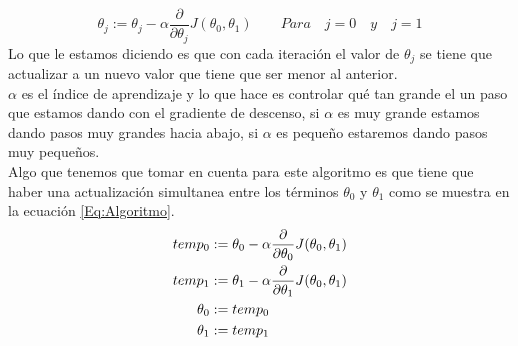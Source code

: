 \documentclass{book}
\begin{document}
\begin{equation}
	\theta_j := \theta_j -\alpha\frac{\partial}{\partial\theta_j}J(\theta_0,\theta_1)\qquad Para\quad j=0\quad y\quad j=1
	\label{Eq:DG}
\end{equation}
Lo que le estamos diciendo es que con cada iteración el valor de $\theta_j$ se tiene que actualizar a un nuevo valor que tiene que ser menor al anterior.\\$\alpha$ es el índice de aprendizaje y lo que hace es controlar qué tan grande el un paso que estamos dando con el gradiente de descenso, si $\alpha$ es muy grande estamos dando pasos muy grandes hacia abajo, si $\alpha$ es pequeño estaremos dando pasos muy pequeños.\\Algo que tenemos que tomar en cuenta para este algoritmo es que tiene que haber una actualización simultanea entre los términos $\theta_0$ y $\theta_1$ como se muestra en la ecuación \ref{Eq:Algoritmo}.
\begin{align}
\notag
	temp_0&:= \theta_0 -\alpha\frac{\partial}{\partial\theta_0}J(\theta_0,\theta_1)\\\notag
	temp_1&:= \theta_1 -\alpha\frac{\partial}{\partial\theta_1}J(\theta_0,\theta_1)\\\notag
	\theta_0&:=temp_0\\\notag
	\theta_1&:=temp_1\\
	\label{Eq:Algoritmo}
\end{align}
 
\end{document}
